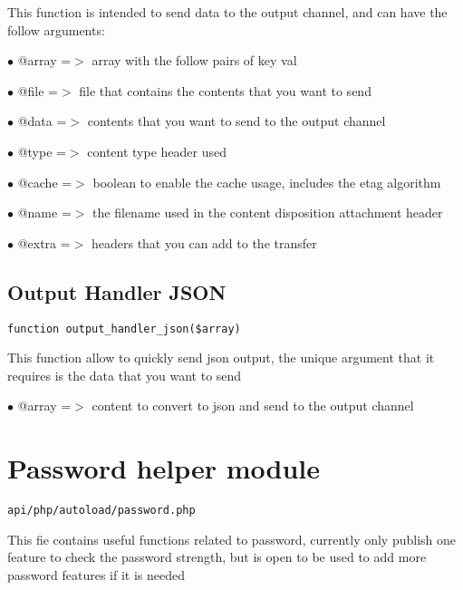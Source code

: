\documentclass[a4paper]{book}
\begin{document}
This function is intended to send data to the output channel, and can have
the follow arguments:

\begin{compactitem}
\item[\color{myblue}$\bullet$] @array =$>$ array with the follow pairs of key val
\item[\color{myblue}$\bullet$] @file  =$>$ file that contains the contents that you want to send
\item[\color{myblue}$\bullet$] @data  =$>$ contents that you want to send to the output channel
\item[\color{myblue}$\bullet$] @type  =$>$ content type header used
\item[\color{myblue}$\bullet$] @cache =$>$ boolean to enable the cache usage, includes the etag algorithm
\item[\color{myblue}$\bullet$] @name  =$>$ the filename used in the content disposition attachment header
\item[\color{myblue}$\bullet$] @extra =$>$ headers that you can add to the transfer
\end{compactitem}

\hypertarget{toc216}{}
\subsection{Output Handler JSON}

\begin{lstlisting}
function output_handler_json($array)
\end{lstlisting}

This function allow to quickly send json output, the unique argument that it
requires is the data that you want to send

\begin{compactitem}
\item[\color{myblue}$\bullet$] @array =$>$ content to convert to json and send to the output channel
\end{compactitem}

\hypertarget{toc217}{}
\section{Password helper module}

\begin{lstlisting}
api/php/autoload/password.php
\end{lstlisting}

This fie contains useful functions related to password, currently only publish one feature to check
the password strength, but is open to be used to add more password features if it is needed
\end{document}
